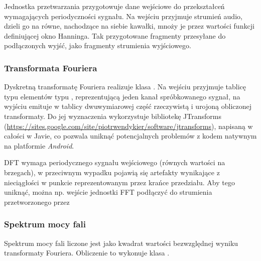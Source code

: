 Jednostka przetwarzania  przygotowuje dane wejściowe do przekształceń
wymagających periodyczności sygnału. Na wejściu przyjmuje strumień audio, dzieli go na równe,
nachodzące na siebie kawałki, mnoży je przez wartości funkcji definiującej okno Hanninga. Tak
przygotowane fragmenty przesyłane do podłączonych wyjść, jako fragmenty strumienia wyjściowego.


\subsubsection{Transformata Fouriera}

Dyskretną transformatę Fouriera realizuje klasa . Na wejściu przyjmuje tablicę typu
elementów typu , reprezentującą jeden kanał spróbkowanego sygnał, na wyjściu emituje w
tablicy dwuwymiarowej część rzeczywistą i urojoną obliczonej transformaty. Do jej wyznaczenia
wykorzystuje bibliotekę JTransforms
(\url{https://sites.google.com/site/piotrwendykier/software/jtransforms}), napisaną w całości w
Javie, co pozwala uniknąć potencjalnych problemów z kodem natywnym na platformie \emph{Android}.

\begin{Note}
  DFT wymaga periodycznego sygnału wejściowego (równych wartości na brzegach), w przeciwnym wypadku
  pojawią się artefakty wynikające z nieciągłości w punkcie reprezentowanym przez krańce przedziału.
  Aby tego uniknąć, można np. wejście jednostki FFT podłączyć do strumienia przetworzonego przez
\end{Note}


\subsubsection{Spektrum mocy fali}

Spektrum mocy fali liczone jest jako kwadrat wartości bezwzględnej wyniku transformaty Fouriera.
Obliczenie to wykonuje klasa .

